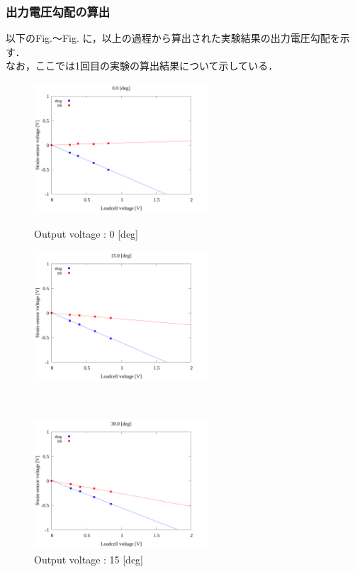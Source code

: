 \newpage

\subsubsection{出力電圧勾配の算出}

以下のFig.～Fig. に，以上の過程から算出された実験結果の出力電圧勾配を示す．\\
なお，ここでは1回目の実験の算出結果について示している．

\begin{figure}[htbp]
    \begin{minipage}[b]{0.45\linewidth}
      \centering
      \includegraphics[width=65mm]{../../02_workspace/result/2-1/plot/04/04_linear_0.png}
      \caption{Output voltage : 0 [deg]}
    \end{minipage}
    \begin{minipage}[b]{0.45\linewidth}
      \centering
      \includegraphics[width=65mm]{../../02_workspace/result/2-1/plot/04/04_linear_150.png}
      \caption{Output voltage : 15 [deg]}
    \end{minipage} \\
    \begin{minipage}[b]{0.45\linewidth}
        \centering
        \includegraphics[width=65mm]{../../02_workspace/result/2-1/plot/04/04_linear_300.png}

\end{minipage}
\end{figure}
